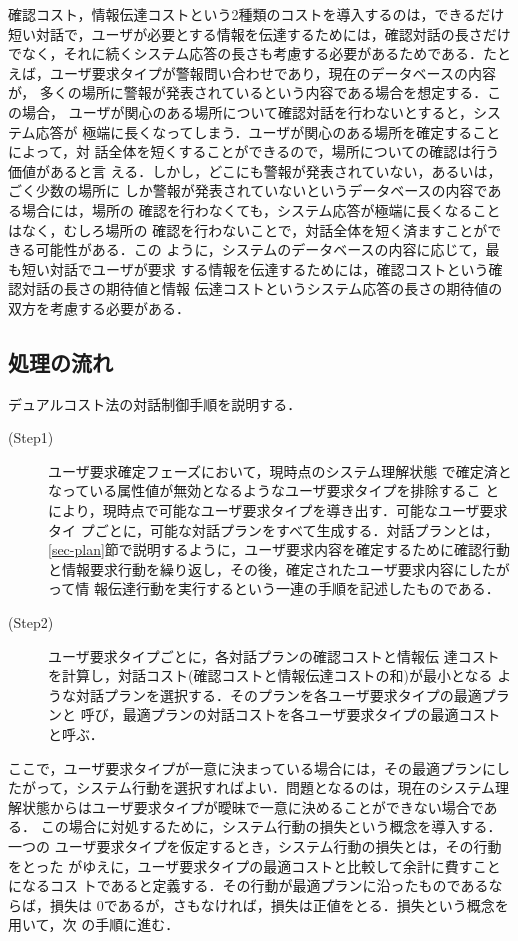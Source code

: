 確認コスト，情報伝達コストという2種類のコストを導入するのは，できるだけ
短い対話で，ユーザが必要とする情報を伝達するためには，確認対話の長さだけ
でなく，それに続くシステム応答の長さも考慮する必要があるためである．たと
えば，ユーザ要求タイプが警報問い合わせであり，現在のデータベースの内容が，
多くの場所に警報が発表されているという内容である場合を想定する．この場合，
ユーザが関心のある場所について確認対話を行わないとすると，システム応答が
極端に長くなってしまう．ユーザが関心のある場所を確定することによって，対
話全体を短くすることができるので，場所についての確認は行う価値があると言
える．しかし，どこにも警報が発表されていない，あるいは，ごく少数の場所に
しか警報が発表されていないというデータベースの内容である場合には，場所の
確認を行わなくても，システム応答が極端に長くなることはなく，むしろ場所の
確認を行わないことで，対話全体を短く済ますことができる可能性がある．この
ように，システムのデータベースの内容に応じて，最も短い対話でユーザが要求
する情報を伝達するためには，確認コストという確認対話の長さの期待値と情報
伝達コストというシステム応答の長さの期待値の双方を考慮する必要がある．

\subsection{処理の流れ}
\label{sec-procedure}

デュアルコスト法の対話制御手順を説明する．

\begin{description}
\item[(Step1)] ユーザ要求確定フェーズにおいて，現時点のシステム理解状態
で確定済となっている属性値が無効となるようなユーザ要求タイプを排除するこ
とにより，現時点で可能なユーザ要求タイプを導き出す．可能なユーザ要求タイ
プごとに，可能な対話プランをすべて生成する．対話プランとは，
\ref{sec-plan}節で説明するように，ユーザ要求内容を確定するために確認行動
と情報要求行動を繰り返し，その後，確定されたユーザ要求内容にしたがって情
報伝達行動を実行するという一連の手順を記述したものである．
\item[(Step2)] ユーザ要求タイプごとに，各対話プランの確認コストと情報伝
達コストを計算し，対話コスト(確認コストと情報伝達コストの和)が最小となる
ような対話プランを選択する．そのプランを各ユーザ要求タイプの最適プランと
呼び，最適プランの対話コストを各ユーザ要求タイプの最適コストと呼ぶ．
\end{description}

ここで，ユーザ要求タイプが一意に決まっている場合には，その最適プランにし
たがって，システム行動を選択すればよい．問題となるのは，現在のシステム理
解状態からはユーザ要求タイプが曖昧で一意に決めることができない場合である．
この場合に対処するために，システム行動の損失という概念を導入する．一つの
ユーザ要求タイプを仮定するとき，システム行動の損失とは，その行動をとった
がゆえに，ユーザ要求タイプの最適コストと比較して余計に費すことになるコス
トであると定義する．その行動が最適プランに沿ったものであるならば，損失は
$0$であるが，さもなければ，損失は正値をとる．損失という概念を用いて，次
の手順に進む．

